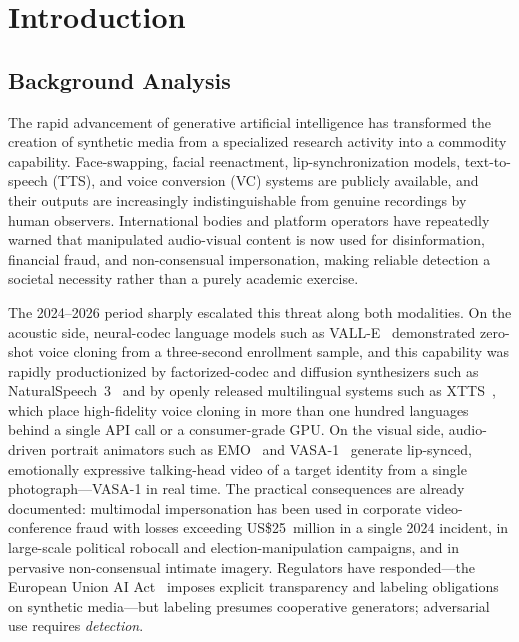 \chapter{Introduction}
\label{ch:introduction}

\section{Background Analysis}
\label{sec:background}

The rapid advancement of generative artificial intelligence has transformed the
creation of synthetic media from a specialized research activity into a
commodity capability. Face-swapping, facial reenactment, lip-synchronization
models, text-to-speech (TTS), and voice conversion (VC) systems are publicly
available, and their outputs are increasingly indistinguishable from genuine
recordings by human observers. International bodies and platform operators have
repeatedly warned that manipulated audio-visual content is now used for
disinformation, financial fraud, and non-consensual impersonation, making
reliable detection a societal necessity rather than a purely academic exercise.

The 2024--2026 period sharply escalated this threat along both modalities.
On the acoustic side, neural-codec language models such as
VALL-E~\cite{wang2023valle} demonstrated zero-shot voice cloning from a
three-second enrollment sample, and this capability was rapidly
productionized by factorized-codec and diffusion synthesizers such as
NaturalSpeech~3~\cite{ju2024naturalspeech3} and by openly released
multilingual systems such as XTTS~\cite{casanova2024xtts}, which place
high-fidelity voice
cloning in more than one hundred languages behind a single API call or a
consumer-grade GPU. On the visual side, audio-driven portrait animators such
as EMO~\cite{tian2024emo} and VASA-1~\cite{xu2024vasa} generate lip-synced,
emotionally expressive talking-head video of a target identity from a single
photograph---VASA-1 in real time. The
practical consequences are already documented: multimodal impersonation has
been used in corporate video-conference fraud with losses exceeding
US\$25~million in a single 2024 incident, in large-scale political
robocall and election-manipulation campaigns, and in pervasive
non-consensual intimate imagery. Regulators have responded---the European
Union AI Act~\cite{euaiact2024} imposes explicit transparency and labeling
obligations on synthetic media---but labeling presumes cooperative
generators; adversarial use requires \emph{detection}.

